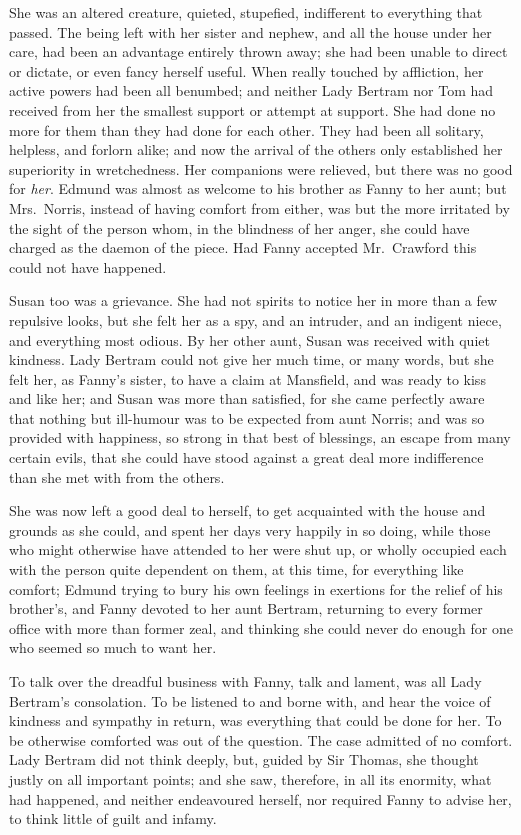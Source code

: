 \documentclass{article}
\begin{document}
She was an altered creature, quieted, stupefied, indifferent to
everything that passed.  The being left with her sister
and nephew, and all the house under her care, had been
an advantage entirely thrown away; she had been unable
to direct or dictate, or even fancy herself useful.
When really touched by affliction, her active powers
had been all benumbed; and neither Lady Bertram nor Tom
had received from her the smallest support or attempt
at support.  She had done no more for them than they
had done for each other.  They had been all solitary,
helpless, and forlorn alike; and now the arrival of the
others only established her superiority in wretchedness.
Her companions were relieved, but there was no good
for \emph{her}.  Edmund was almost as welcome to his brother
as Fanny to her aunt; but Mrs.\ Norris, instead of having
comfort from either, was but the more irritated by the
sight of the person whom, in the blindness of her anger,
she could have charged as the daemon of the piece.
Had Fanny accepted Mr.\ Crawford this could not have happened.

Susan too was a grievance.  She had not spirits to notice
her in more than a few repulsive looks, but she felt
her as a spy, and an intruder, and an indigent niece,
and everything most odious.  By her other aunt, Susan was
received with quiet kindness.  Lady Bertram could not
give her much time, or many words, but she felt her,
as Fanny's sister, to have a claim at Mansfield,
and was ready to kiss and like her; and Susan was more
than satisfied, for she came perfectly aware that nothing
but ill-humour was to be expected from aunt Norris;
and was so provided with happiness, so strong in that
best of blessings, an escape from many certain evils,
that she could have stood against a great deal more
indifference than she met with from the others.

She was now left a good deal to herself, to get acquainted
with the house and grounds as she could, and spent her
days very happily in so doing, while those who might
otherwise have attended to her were shut up, or wholly
occupied each with the person quite dependent on them,
at this time, for everything like comfort; Edmund trying
to bury his own feelings in exertions for the relief
of his brother's, and Fanny devoted to her aunt Bertram,
returning to every former office with more than former zeal,
and thinking she could never do enough for one who seemed
so much to want her.

To talk over the dreadful business with Fanny, talk and lament,
was all Lady Bertram's consolation.  To be listened to and
borne with, and hear the voice of kindness and sympathy
in return, was everything that could be done for her.
To be otherwise comforted was out of the question.
The case admitted of no comfort.  Lady Bertram did not
think deeply, but, guided by Sir Thomas, she thought
justly on all important points; and she saw, therefore,
in all its enormity, what had happened, and neither
endeavoured herself, nor required Fanny to advise her,
to think little of guilt and infamy.
\end{document}
